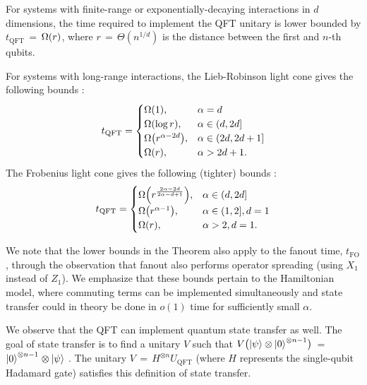 %
\begin{theorem*}  \label{thm:QFTlowerbounds}
  For systems with finite-range or exponentially-decaying interactions in $d$ dimensions, the time required to implement the QFT unitary is lower bounded by $t_\mathrm{QFT}$\,$= $\,$\W{r}$, where $r$\,$=$\,$\Theta(n^{1/d})$ is the distance between the first and $n$-th qubits.

  For systems with long-range interactions, the Lieb-Robinson light cone gives the following bounds \cite{kuwaharaStrictlyLinearLight2020,Tran2019a,Hastings2006,Tran2021b}:
  \begin{align}
  \label{eq:LRlowerbounds}
   t_\mathrm{QFT} =
   \begin{cases}
      \W{1}, & \al = d
      \\ \W{\log r}, & \alpha \in (d,2d]
      \\ \W{r^{\alpha-2d}}, & \alpha \in (2d,2d+1]
      \\ \W{r}, & \alpha > 2d + 1.
    \end{cases}
  \end{align}
  The Frobenius light cone gives the following (tighter) bounds \cite{Kuwahara2021,Chen2021Frobenius}:
  \begin{align}
  \label{eq:Froblowerbounds}
   t_\mathrm{QFT} =
   \begin{cases}
      \W{r^{\frac{2\al-2d}{2\alpha-d+1}}}, & \al \in (d,2d]
      \\ \W{r^{\alpha -1}}, & \alpha \in (1,2], d=1
      \\ \W{r}, & \alpha > 2, d=1.
   \end{cases}
  \end{align}
\end{theorem*}
%
We note that the lower bounds in the Theorem also apply to the fanout time, $t_\mathrm{FO}$, through the observation that fanout also performs operator spreading (using $X_1$ instead of $Z_1$).
We emphasize that these bounds pertain to the Hamiltonian model, where commuting terms can be implemented simultaneously and state transfer could in theory be done in $o(1)$ time for sufficiently small $\alpha$.

We observe that the QFT can implement quantum state transfer as well.
The goal of state transfer is to find a unitary $V$ such that
$V \bigl(\left | \psi \right\rangle \otimes \left | 0 \right\rangle^{\otimes n-1}\bigr)$\,$=$\,$\left | 0 \right\rangle^{\otimes n-1}$\,$\otimes $\,$\left | \psi \right\rangle$ \cite{Eldredge2017,Epstein2017}.
The unitary $V$\,$=$\,$H^{\otimes n} U_\mathrm{QFT}$ (where $H$ represents the single-qubit Hadamard gate) satisfies this definition of state transfer.

